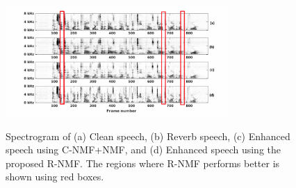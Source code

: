 \begin{figure}[tbh!]
  \centering
  \includegraphics[width=8.5cm, height=5cm]{fig/spectrogram_prop3.png}
  \caption{Spectrogram of (a) Clean speech, (b) Reverb speech, (c) Enhanced speech using C-NMF+NMF, and (d) Enhanced speech using the proposed R-NMF. The regions where R-NMF performs better is shown using red boxes.}
  \label{fig:speech_production}
\end{figure}

